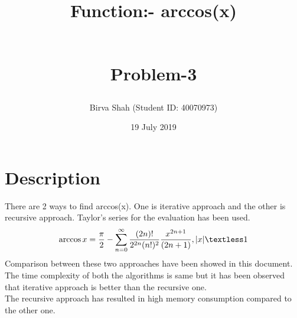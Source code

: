 \documentclass[11pt]{article}
\title{Function:- arccos(x)
\begin{large}
\\
\Large Problem-3
\end{large}
}
\author{Birva Shah (Student ID: 40070973) }
\date{19 July 2019}
\begin{document}
\maketitle
\section{Description}
There are 2 ways to find arccos(x). One is iterative approach and the other is recursive approach. Taylor's series for the evaluation has been used.
\begin{equation}
    \arccos x = \frac{\pi}{2}-\sum_{n=0}^\infty\frac{(2n)!}{2^{2n}(n!)^{2}}\frac{x^{2n+1}}{(2n+1)},|x|\textless1\\
\end{equation}
Comparison between these two approaches have been showed in this document. The time complexity of both the algorithms is same but it has been observed that iterative approach is better than the recursive one. \\
The recursive approach has resulted in high memory consumption compared to the other one.
\end{document}
